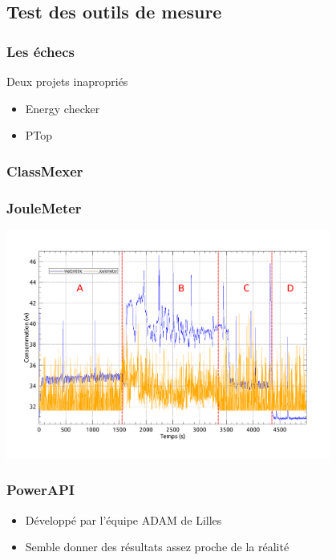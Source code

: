 \documentclass{beamer}
\begin{document}
		\subsection{Test des outils de mesure}
			\begin{frame}
				\frametitle{Les échecs}
					\begin{block}{Deux projets inapropriés}
						\begin{itemize}
							\item Energy checker
							\item PTop
						\end{itemize}
					\end{block}
			\end{frame}
			\begin{frame}
				\frametitle{ClassMexer}
				
			\end{frame}
			\begin{frame}
				\frametitle{JouleMeter}
				\begin{center}
					\includegraphics[width=0.8\textwidth]{figures/joulemeter}
				\end{center}
			\end{frame}
			\begin{frame}
				\frametitle{PowerAPI}
					\begin{itemize}
					  \item Développé par l'équipe ADAM de Lilles
					  \item Semble donner des résultats assez proche de la réalité
					\end{itemize}
			\end{frame}
			
\end{document}
